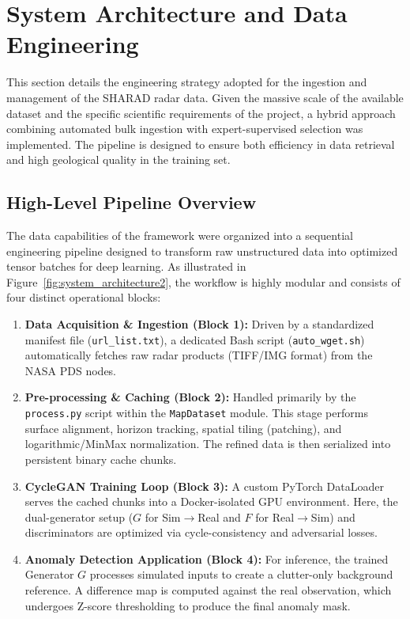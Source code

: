 \section{System Architecture and Data Engineering}
\label{sec:data_acquisition}
This section details the engineering strategy adopted for the ingestion and management of the SHARAD radar data.
Given the massive scale of the available dataset and the specific scientific requirements of the project, a hybrid approach combining automated bulk ingestion with expert-supervised selection was implemented.
The pipeline is designed to ensure both efficiency in data retrieval and high geological quality in the training set.

\subsection{High-Level Pipeline Overview}
The data capabilities of the framework were organized into a sequential engineering pipeline designed to transform raw unstructured data into optimized tensor batches for deep learning.
As illustrated in Figure~\ref{fig:system_architecture2}, the workflow is highly modular and consists of four distinct operational blocks:

\begin{enumerate}
    \item \textbf{Data Acquisition \& Ingestion (Block 1):} Driven by a standardized manifest file (\texttt{url\_list.txt}), a dedicated Bash script (\texttt{auto\_wget.sh}) automatically fetches raw radar products (TIFF/IMG format) from the NASA PDS nodes.
    \item \textbf{Pre-processing \& Caching (Block 2):} Handled primarily by the \texttt{process.py} script within the \texttt{MapDataset} module. This stage performs surface alignment, horizon tracking, spatial tiling (patching), and logarithmic/MinMax normalization. The refined data is then serialized into persistent binary cache chunks.
    \item \textbf{CycleGAN Training Loop (Block 3):} A custom PyTorch DataLoader serves the cached chunks into a Docker-isolated GPU environment. Here, the dual-generator setup ($G$ for Sim$\rightarrow$Real and $F$ for Real$\rightarrow$Sim) and discriminators are optimized via cycle-consistency and adversarial losses.
    \item \textbf{Anomaly Detection Application (Block 4):} For inference, the trained Generator $G$ processes simulated inputs to create a clutter-only background reference. A difference map is computed against the real observation, which undergoes Z-score thresholding to produce the final anomaly mask.
\end{enumerate}

